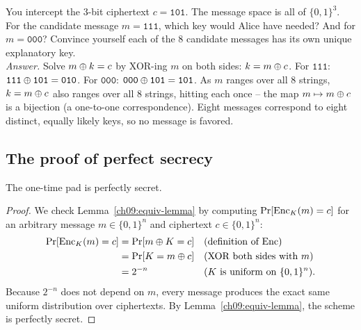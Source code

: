 \begin{walkbox}
You intercept the 3-bit ciphertext $c = \texttt{101}$. The message space is all of $\{0,1\}^3$. For the candidate message $m = \texttt{111}$, which key would Alice have needed? And for $m = \texttt{000}$? Convince yourself each of the $8$ candidate messages has its own unique explanatory key. \\[2pt]
\emph{Answer.} Solve $m \oplus k = c$ by XOR-ing $m$ on both sides: $k = m \oplus c$. For $\texttt{111}$: $\texttt{111}\oplus\texttt{101} = \texttt{010}$. For $\texttt{000}$: $\texttt{000}\oplus\texttt{101}=\texttt{101}$. As $m$ ranges over all $8$ strings, $k = m \oplus c$ also ranges over all $8$ strings, hitting each once -- the map $m \mapsto m\oplus c$ is a bijection (a one-to-one correspondence). Eight messages correspond to eight distinct, equally likely keys, so no message is favored.
\end{walkbox}

\subsection{The proof of perfect secrecy}
\label{ch09:otp-proof}

\begin{theorem}[Shannon, 1949]
\label{ch09:otp-secure}
The one-time pad is perfectly secret.
\end{theorem}

\begin{proof}
We check Lemma~\ref{ch09:equiv-lemma} by computing $\Pr[\operatorname{Enc}_K(m) = c]$ for an arbitrary message $m \in \{0,1\}^n$ and ciphertext $c \in \{0,1\}^n$:
\begin{align*}
  \Pr[\operatorname{Enc}_K(m) = c] &= \Pr[m \oplus K = c] && \text{(definition of $\operatorname{Enc}$)} \\
                     &= \Pr[K = m \oplus c] && \text{(XOR both sides with $m$)} \\
                     &= 2^{-n}            && \text{($K$ is uniform on $\{0,1\}^n$)}.
\end{align*}
Because $2^{-n}$ does not depend on $m$, every message produces the exact same uniform distribution over ciphertexts. By Lemma~\ref{ch09:equiv-lemma}, the scheme is perfectly secret.
\end{proof}

